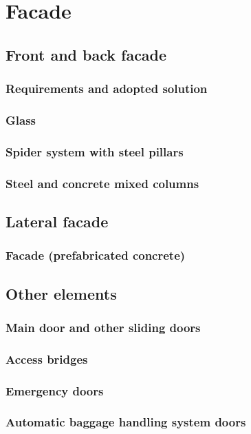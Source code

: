 \chapter{Facade}

	\section{Front and back facade}
		\subsection{Requirements and adopted solution}
		\subsection{Glass}
		\subsection{Spider system with steel pillars}
		\subsection{Steel and concrete mixed columns}
	
	\section{Lateral facade}
		\subsection{Facade (prefabricated concrete)}

	\section{Other elements}
		\subsection{Main door and other sliding doors}
		\subsection{Access bridges}
		\subsection{Emergency doors}
		\subsection{Automatic baggage handling system doors}
		
